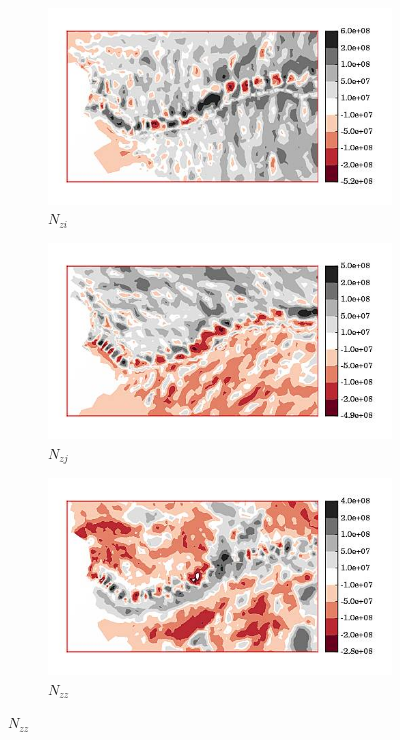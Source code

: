 \begin{figure}
  \begin{subfigure}[b]{0.32\linewidth}
    \includegraphics[width=\linewidth]{images/internal_energy/jakob_results/inversion_Wc_0.01/stress_balance/N_zi.jpg}
  \caption{$N_{zi}$}
  \label{N_zi}
  \end{subfigure}
  \begin{subfigure}[b]{0.32\linewidth}
    \includegraphics[width=\linewidth]{images/internal_energy/jakob_results/inversion_Wc_0.01/stress_balance/N_zj.jpg}
  \caption{$N_{zj}$}
  \label{N_zj}
  \end{subfigure}
  \begin{subfigure}[b]{0.32\linewidth}
    \includegraphics[width=\linewidth]{images/internal_energy/jakob_results/inversion_Wc_0.01/stress_balance/N_zz.jpg}
  \caption{$N_{zz}$}
  \label{N_zz}
  \end{subfigure}
  

\end{figure}

